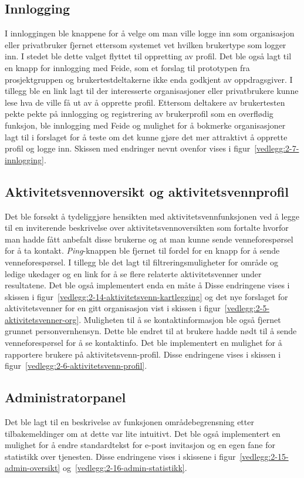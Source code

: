 \subsection{Innlogging}
 I innloggingen ble knappene for å velge om man ville logge inn som organisasjon eller privatbruker fjernet ettersom systemet vet hvilken brukertype som logger inn. I stedet ble dette valget flyttet til oppretting av profil. Det ble også lagt til en knapp for innlogging med Feide, som et forslag til prototypen fra prosjektgruppen og brukertestdeltakerne ikke enda godkjent av oppdragsgiver. I tillegg ble en link lagt til der interesserte organisasjoner eller privatbrukere kunne lese hva de ville få ut av å opprette profil. Ettersom deltakere av brukertesten pekte pekte på innlogging og registrering av brukerprofil som en overflødig funksjon, ble innlogging med Feide og mulighet for å bokmerke organisasjoner lagt til i forslaget for å teste om det kunne gjøre det mer attraktivt å opprette profil og logge inn. Skissen med endringer nevnt ovenfor vises i figur~\ref{vedlegg:2-7-innlogging}.

 
 \subsection{Aktivitetsvennoversikt og aktivitetsvennprofil}
 
 Det ble forsøkt å tydeliggjøre hensikten med aktivitetsvennfunksjonen ved å legge til en inviterende beskrivelse over aktivitetsvennoversikten som fortalte hvorfor man hadde fått anbefalt disse brukerne og at man kunne sende venneforespørsel for å ta kontakt. {\em  Ping}-knappen ble fjernet til fordel for en knapp for å sende venneforespørsel. I tillegg ble det lagt til filtreringsmuligheter for område og ledige ukedager og en link for å se flere relaterte aktivitetsvenner under resultatene. Det ble også implementert enda en måte å  Disse endringene vises i skissen i figur~\ref{vedlegg:2-14-aktivitetsvenn-kartlegging} og det nye forslaget for aktivitetsvenner for en gitt organisasjon vist i skissen i figur~\ref{vedlegg:2-5-aktivitetsvenner-org}. Muligheten til å se kontaktinformasjon ble også fjernet grunnet personvernhensyn. Dette ble endret til at brukere hadde nødt til å sende venneforespørsel for å se kontaktinfo. Det ble implementert en mulighet for å rapportere brukere på aktivitetsvenn-profil. Disse endringene vises i skissen i figur~\ref{vedlegg:2-6-aktivitetsvenn-profil}.
 
 \subsection{Administratorpanel}
 Det ble lagt til en beskrivelse av funksjonen områdebegrensning etter tilbakemeldinger om at dette var lite intuitivt. Det ble også implementert en mulighet for å endre standardtekst for e-post invitasjon og en egen fane for statistikk over tjenesten. Disse endringene vises i skissene i figur~\ref{vedlegg:2-15-admin-oversikt} og~\ref{vedlegg:2-16-admin-statistikk}.
 
